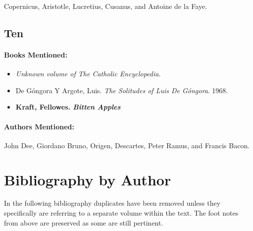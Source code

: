 \documentclass[12pt]{article}
\providecommand{\tightlist}{%
  \setlength{\itemsep}{0pt}\setlength{\parskip}{0pt}}
\begin{document}
Copernicus, Aristotle, Lucretius, Cusanus, and Antoine de la Faye.

\subsection{Ten}\label{ten}

\paragraph{Books Mentioned:}\label{books-mentioned-24}

\begin{itemize}
\tightlist
\item
  \emph{Unknown volume of The Catholic Encyclopedia}.
\item
  De Góngora Y Argote, Luis. \emph{The Solitudes of Luis De Góngora}. 1968.
\item
  \textbf{Kraft, Fellowes. \emph{Bitten Apples}}
\end{itemize}

\paragraph{Authors Mentioned:}\label{authors-mentioned-18}

John Dee, Giordano Bruno, Origen, Descartes, Peter Ramus, and Francis Bacon.

\section{Bibliography by Author}\label{bibliography-by-author}

In the following bibliography duplicates have been removed unless they specifically are referring to a separate volume within the text. The foot notes from above are preserved as some are still pertinent.
\end{document}
